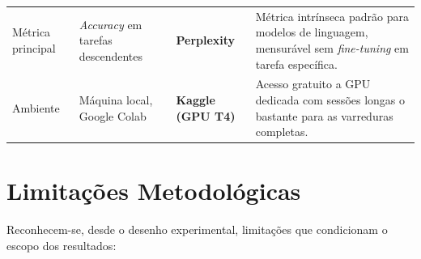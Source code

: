 \begin{quadro}[htbp]
\begin{tabular}{>{\raggedright\arraybackslash}p{2.4cm} >{\raggedright\arraybackslash}p{3.4cm} >{\raggedright\arraybackslash}p{2.6cm} >{\raggedright\arraybackslash}p{5.1cm}}
Métrica principal
& \textit{Accuracy} em tarefas descendentes
& \textbf{Perplexity}
& Métrica intrínseca padrão para modelos de linguagem, mensurável sem
  \textit{fine-tuning} em tarefa específica. \\

Ambiente
& Máquina local, Google Colab
& \textbf{Kaggle (GPU T4)}
& Acesso gratuito a GPU dedicada com sessões longas o bastante para as varreduras
  completas. \\
\hline
\end{tabular}
\end{quadro}

\clearpage

\section{Limitações Metodológicas}\label{sec:limitacoes}

Reconhecem-se, desde o desenho experimental, limitações que condicionam o escopo dos
resultados:

